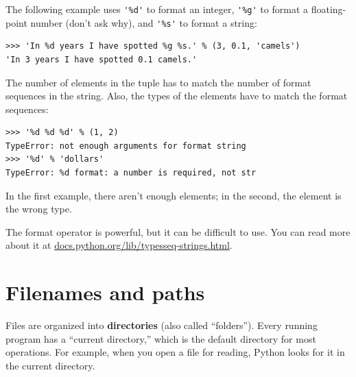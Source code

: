 \documentclass[10pt]{book}
\begin{document}
The following example uses \verb"'%d'" to format an integer,
\verb"'%g'" to format
a floating-point number (don't ask why), and \verb"'%s'" to format
a string:

\beforeverb
\begin{verbatim}
>>> 'In %d years I have spotted %g %s.' % (3, 0.1, 'camels')
'In 3 years I have spotted 0.1 camels.'
\end{verbatim}
\afterverb
%
The number of elements in the tuple has to match the number
of format sequences in the string.  Also, the types of the
elements have to match the format sequences:


\beforeverb
\begin{verbatim}
>>> '%d %d %d' % (1, 2)
TypeError: not enough arguments for format string
>>> '%d' % 'dollars'
TypeError: %d format: a number is required, not str
\end{verbatim}
\afterverb
%
In the first example, there aren't enough elements; in the
second, the element is the wrong type.

The format operator is powerful, but it can be difficult to use.  You
can read more about it at
\url{docs.python.org/lib/typesseq-strings.html}.




\section{Filenames and paths}
\label{paths}


Files are organized into {\bf directories} (also called ``folders'').
Every running program has a ``current directory,'' which is the
default directory for most operations.  
For example, when you open a file for reading, Python looks for it in the
current directory.

\end{document}
